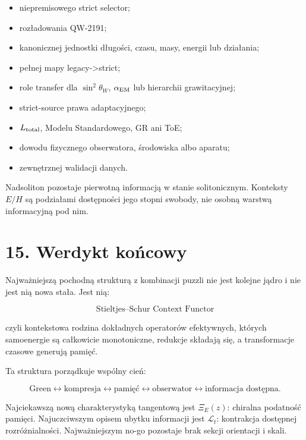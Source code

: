 \documentclass[11pt,a4paper,openany]{report}
\begin{document}
\begin{itemize}
\item 
niepremisowego strict selector;

\item 
rozładowania QW-2191;

\item 
kanonicznej jednostki długości, czasu, masy, energii lub działania;

\item 
pełnej mapy legacy->strict;

\item 
role transfer dla \(\sin^2\theta_W\), \(\alpha_{\rm EM}\) lub hierarchii grawitacyjnej;

\item 
strict-source prawa adaptacyjnego;

\item 
\(L_{\rm total}\), Modelu Standardowego, GR ani ToE;

\item 
dowodu fizycznego obserwatora, środowiska albo aparatu;

\item 
zewnętrznej walidacji danych.

\end{itemize}

Nadsoliton pozostaje pierwotną informacją w stanie solitonicznym. Konteksty \(E/H\) są podziałami dostępności jego stopni swobody, nie osobną warstwą informacyjną pod nim.

\chapter{15. Werdykt końcowy}

Najwa\.zniejszą pochodną strukturą z kombinacji puzzli nie jest kolejne jądro i nie jest nią nowa stała. Jest nią:

\[
\boxed{
\text{Stieltjes--Schur Context Functor}
}
\]

czyli kontekstowa rodzina dokładnych operatorów efektywnych, których samoenergie są całkowicie monotoniczne, redukcje składają się, a transformacje czasowe generują pamięć.

Ta struktura porządkuje wspólny cień:

\[
\text{Green}
\leftrightarrow
\text{kompresja}
\leftrightarrow
\text{pamięć}
\leftrightarrow
\text{obserwator}
\leftrightarrow
\text{informacja dostępna}.
\]

Najciekawszą nową charakterystyką tangentową jest \(\Xi_E(z)\): chiralna podatność pamięci. Najuczciwszym opisem ubytku informacji jest \(\mathcal L_t\): kontrakcja dostępnej rozró\.znialności. Najwa\.zniejszym no-go pozostaje brak sekcji orientacji i skali.
\end{document}
